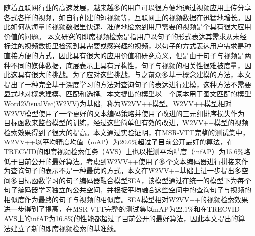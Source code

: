 \begin{abstractzh}
    随着互联网行业的高速发展，越来越多的用户可以很方便地通过视频应用上传分享各式各样的视频，如自行创建的短视频等，互联网上的视频数据在迅猛地增长。因此如何从海量的视频数据里快速、准确地检索到用户需要的视频是个具有很大应用价值的问题。
    本文研究的即席视频检索是指用户以句子的形式表达其需求从未经标注的视频数据里检索到其需要或感兴趣的视频，以句子的方式表达用户需求是种直接方便的方式，因此具有很大的应用价值和研究意义，但是由于句子与视频是两种不同的媒体数据，底层表示上具有异构性，句子与视频的相关性很难被度量，因此这具有很大的挑战。为了应对这些挑战，与之前众多基于概念建模的方法，本文提出了一种完全基于深度学习的方法对查询句子的表达进行建模，这种方法不需要显式地对概念建模、匹配和选择。本文提出的模型以一个原本用于图文匹配的模型Word2VisualVec(W2VV)为基础，称为W2VV++模型。W2VV++模型相对W2VV模型使用了一个更好的文本编码策略并使用了改进的三元组排序损失作为目标函数来监督模型的训练，经过这些简单但有效的改进，W2VV++模型的视频检索效果得到了很大的提高。本文通过实验证明，在MSR-VTT完整的测试集中，W2VV++以平均精度均值（mAP）为20.6\%超过了目前公开最好的算法，在TRECVID的即席视频检索任务（AVS）上也以推测平均精度（infAP）为15.6\%略低于目前公开的最好算法。考虑到W2VV++使用了多个文本编码器进行拼接来作为查询句子的表示不是一种最优的方式，本文在W2VV++基础上进一步提出多空间多目标函数学习的句子编码器融合模型SEA，该模型通过在统一的模型下为每个句子编码器学习独立的公共空间，并根据平均融合这些空间中的查询句子与视频的相似度作为最终的句子与视频的相似度。SEA模型相对W2VV++的视频检索效果进一步得到了提高，在MSR-VTT完整的测试集以mAP为22.1\%和在TRECVID AVS上的infAP为16.8\%的性能都超过了目前公开的最好算法，因此本文提出的算法建立了新的即席视频检索的基准线。

\end{abstractzh}
